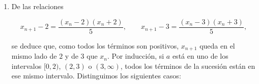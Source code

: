 \documentclass[
  spanish,
  a4paper,
]{scrreport}
\theoremstyle{definition}
\theoremstyle{remark}
\begin{document}
\begin{tcolorbox}
\begin{enumerate}
  \[
  |x_{n+1}-2| = \left|\frac{x_n^2+6}{5}-2\right| = \frac{|x_n^2-4|}{5} = \frac{|x_n-2|\,|x_n+2|}{5}.
  \]

  Como por el apartado anterior \(1\leq x_n<2\), se tiene
  \(0 < x_n+2 < 4\), y por tanto
  \(|x_{n+1}-2| \leq \frac{4}{5}|x_n-2|\). Aplicando esta desigualdad
  repetidamente (o por inducción),

  \[
  |x_n - 2| \leq \frac{4}{5}|x_{n-1}-2| \leq \left(\frac{4}{5}\right)^2|x_{n-2}-2| \leq \cdots \leq \left(\frac{4}{5}\right)^{n-1}|x_1-2| = \left(\frac{4}{5}\right)^{n-1}.
  \]

  Obsérvese que esto proporciona otra demostración de la convergencia,
  ya que \(\left(\frac{4}{5}\right)^{n-1}\to 0\) y por el teorema de
  compresión \(|x_n-2|\to 0\).

  Como la población se mide en miles, un insecto corresponde a
  \(10^{-3}\), y para garantizar un error menor que \(10^{-3}\) basta
  con que

  \[
  \left(\frac{4}{5}\right)^{n-1} < 10^{-3} \Leftrightarrow (n-1)\ln\left(\frac{5}{4}\right) > 3\ln(10) \Leftrightarrow n-1 > \frac{3\ln(10)}{\ln(5/4)} \approx 30.96,
  \]

  es decir, a partir de la semana \(n=32\).
\item
  De las relaciones

  \[
  x_{n+1}-2 = \frac{(x_n-2)(x_n+2)}{5}, \qquad x_{n+1}-3 = \frac{(x_n-3)(x_n+3)}{5},
  \]

  se deduce que, como todos los términos son positivos, \(x_{n+1}\)
  queda en el mismo lado de \(2\) y de \(3\) que \(x_n\). Por inducción,
  si \(a\) está en uno de los intervalos \([0,2)\), \((2,3)\) o
  \((3,\infty)\), todos los términos de la sucesión están en ese mismo
  intervalo. Distinguimos los siguientes casos:


\end{enumerate}
\end{tcolorbox}
\end{document}
